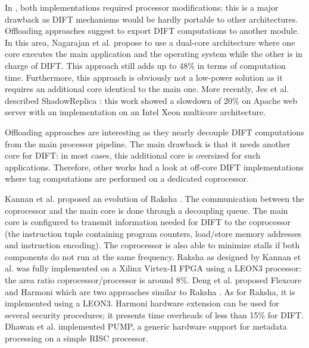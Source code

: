 \documentclass[10pt,a4paper, oneside]{memoir}
\begin{document}
In \cite{Dalton07,Venkataramani08}, both implementations required processor modifications: this is a major drawback as DIFT mechanisms would be hardly portable to other architectures. Offloading approaches suggest to export DIFT computations to another module. In this area, Nagarajan et al. \cite{Nagarajan08} propose to use a dual-core architecture where one core executes the main application and the operating system while the other is in charge of DIFT. This approach still adds up to 48\% in terms of computation time. Furthermore, this approach is obviously not a low-power solution as it requires an additional core identical to the main one. More recently, Jee et al. described ShadowReplica \cite{Jee13}: this work showed a slowdown of 20\% on Apache web server with an implementation on an Intel Xeon multicore architecture.

Offloading approaches are interesting as they nearly decouple DIFT computations from the main processor pipeline. The main drawback is that it needs another core for DIFT: in most cases, this additional core is oversized for such applications. Therefore, other works had a look at off-core DIFT implementations where tag computations are performed on a dedicated coprocessor. 

Kannan et al. \cite{Kannan09} proposed an evolution of Raksha \cite{Dalton07}. The communication between the coprocessor and the main core is done through a decoupling queue. The main core is configured to transmit information needed for DIFT to the coprocessor (the instruction tuple containing program counters, load/store memory addresses and instruction encoding). The coprocessor is also able to minimize stalls if both components do not run at the same frequency. Raksha as designed by Kannan et al. was fully implemented on a Xilinx Virtex-II FPGA using a LEON3 processor: the area ratio coprocessor/processor is around 8\%.
Deng et al. \cite{Deng10,Deng12} proposed Flexcore and Harmoni which are two approaches similar to Raksha \cite{Kannan09}. As for Raksha, it is implemented using a LEON3. Harmoni hardware extension \cite{Deng12} can be used for several security procedures; it presents time overheads of less than 15\% for DIFT. Dhawan et al. \cite{Dhawan15} implemented PUMP, a generic hardware support for metadata processing on a simple RISC processor.
\end{document}

